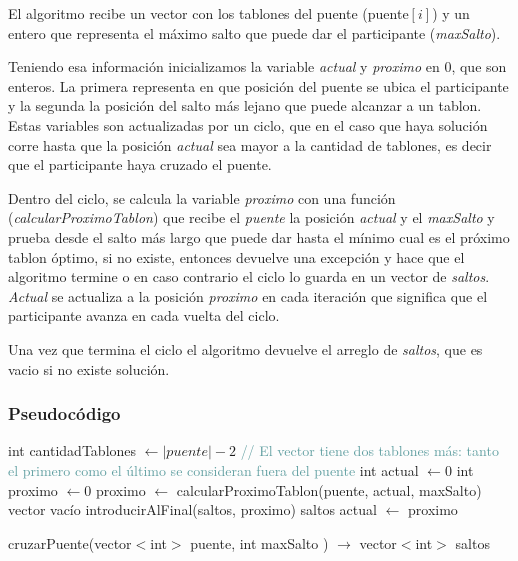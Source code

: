 El algoritmo recibe un vector con los tablones del puente (puente$[i]$) y un entero que representa el máximo salto que puede dar el participante (\textit{maxSalto}).

Teniendo esa informaci\'on inicializamos la variable \textit{actual} y \textit{proximo} en $0$, que son enteros. La primera representa en que posici\'on del puente se ubica el participante y la segunda la posici\'on del salto m\'as lejano que puede alcanzar a un tablon.
Estas variables son actualizadas por un ciclo, que en el caso que haya soluci\'on corre hasta que la posici\'on \textit{actual} sea mayor a la cantidad de tablones, es decir que el participante haya cruzado el puente.

Dentro del ciclo, se calcula la variable \textit{proximo} con una funci\'on (\textit{calcularProximoTablon}) que recibe el \textit{puente} la posici\'on \textit{actual} y el \textit{maxSalto} y prueba desde el salto m\'as largo que puede dar hasta el m\'inimo cual es el pr\'oximo tablon \'optimo, si no existe, entonces devuelve una excepci\'on y hace que el algoritmo termine o en caso contrario el ciclo lo guarda en un vector de \textit{saltos}.
\textit{Actual} se actualiza a la posici\'on \textit{proximo} en cada iteraci\'on que significa que el participante avanza en cada vuelta del ciclo.

Una vez que termina el ciclo el algoritmo devuelve el arreglo de \textit{saltos}, que es vacio si no existe soluci\'on.

\subsubsection{Pseudoc\'odigo}
\begin{algorithm}[H]
\begin{algorithmic}[1]
\STATE int cantidadTablones $\gets |puente| - 2$ \textcolor{CadetBlue}{// El vector tiene dos tablones más: tanto el primero como el último se consideran fuera del puente}
\STATE int actual $\gets 0$
\STATE int proximo $\gets 0$
    \STATE proximo $\gets$ calcularProximoTablon(puente, actual, maxSalto)
        \RETURN vector vacío
    \ENDIF
    \STATE introducirAlFinal(saltos, proximo)
        \RETURN saltos
    \ENDIF
    \STATE actual $\gets$ proximo
\ENDWHILE
\caption{cruzarPuente(vector$<$int$>$ puente, int maxSalto ) $\rightarrow$ vector$<$int$>$ saltos}
\end{algorithmic}
\end{algorithm}

